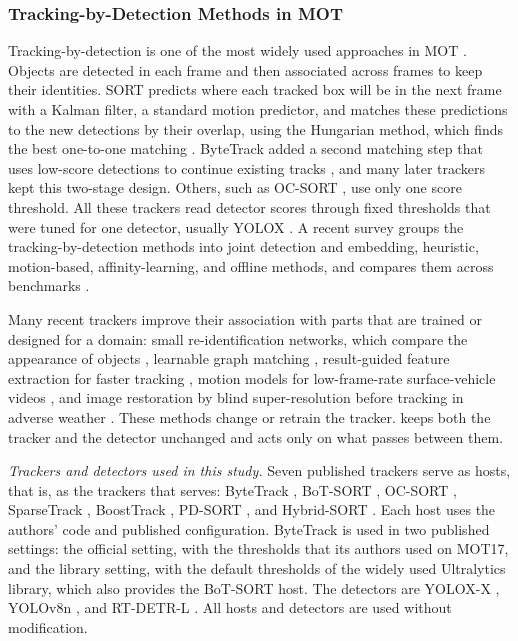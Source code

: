 \subsubsection{Tracking-by-Detection Methods in MOT}\label{sec:hosts}
Tracking-by-detection is one of the most widely used approaches in MOT \cite{adzemovic2026survey}.
Objects are detected in each frame and then associated across frames to keep their identities.
SORT predicts where each tracked box will be in the next frame with a Kalman filter, a standard
motion predictor, and matches these predictions to the new detections by their overlap, using the
Hungarian method, which finds the best one-to-one matching \cite{bewley2016sort}. ByteTrack added a
second matching step that uses low-score detections to continue existing tracks
\cite{zhang2022bytetrack}, and many later trackers kept this two-stage design. Others, such as
OC-SORT \cite{cao2023ocsort}, use only one score threshold. All these trackers read detector scores
through fixed thresholds that were tuned for one detector, usually YOLOX \cite{ge2021yolox}. A recent
survey groups the tracking-by-detection methods into joint detection and embedding, heuristic,
motion-based, affinity-learning, and offline methods, and compares them across benchmarks
\cite{adzemovic2026survey}.

Many recent trackers improve their association with parts that are trained or designed for a
domain: small re-identification networks, which compare the appearance of objects
\cite{li2024fdbtrack}, learnable graph matching \cite{bao2024graphmatching,zhang2025sinkhorn},
result-guided feature extraction for faster tracking \cite{ding2025remot}, motion models for
low-frame-rate surface-vehicle videos \cite{liang2024motiontrack}, and image restoration by blind
super-resolution before tracking in adverse weather \cite{sun2026bsr}. These methods change or
retrain the tracker. \scl{} keeps both the tracker and the detector unchanged and acts only on what
passes between them.

\emph{Trackers and detectors used in this study.} Seven published trackers serve as hosts, that
is, as the trackers that \scl{} serves: ByteTrack \cite{zhang2022bytetrack}, BoT-SORT
\cite{aharon2022botsort}, OC-SORT \cite{cao2023ocsort}, SparseTrack \cite{liu2025sparsetrack},
BoostTrack \cite{stanojevic2024boosttrack}, PD-SORT \cite{wang2025pdsort}, and Hybrid-SORT
\cite{yang2024hybridsort}. Each host uses the authors' code and published configuration. ByteTrack
is used in two published settings: the official setting, with the thresholds that its authors used
on MOT17, and the library setting, with the default thresholds of the widely used Ultralytics
library, which also provides the BoT-SORT host. The detectors are YOLOX-X \cite{ge2021yolox},
YOLOv8n \cite{jocher2023yolov8}, and RT-DETR-L \cite{zhao2024rtdetr}. All hosts and detectors are
used without modification.

